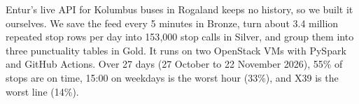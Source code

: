\noindent
Entur's live API for Kolumbus buses in Rogaland keeps no history, so we built it ourselves.
We save the feed every 5 minutes in Bronze, turn about 3.4 million repeated stop rows per day
into 153{,}000 stop calls in Silver, and group them into three punctuality tables in Gold. It
runs on two OpenStack VMs with PySpark and GitHub Actions. Over 27 days (27 October to
22 November 2026), 55\% of stops are on time, 15:00 on weekdays is the worst hour (33\%), and
X39 is the worst line (14\%).
